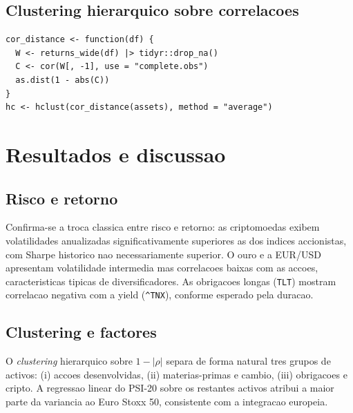 \documentclass[11pt,a4paper]{article}
\begin{document}
\subsection{Clustering hierarquico sobre correlacoes}
\begin{lstlisting}[caption={Distancia 1 - |cor| e dendrograma.}]
cor_distance <- function(df) {
  W <- returns_wide(df) |> tidyr::drop_na()
  C <- cor(W[, -1], use = "complete.obs")
  as.dist(1 - abs(C))
}
hc <- hclust(cor_distance(assets), method = "average")
\end{lstlisting}


\section{Resultados e discussao}

\subsection{Risco e retorno}

Confirma-se a troca classica entre risco e retorno: as criptomoedas
exibem volatilidades anualizadas significativamente superiores as dos
indices accionistas, com Sharpe historico nao necessariamente
superior. O ouro e a EUR/USD apresentam volatilidade intermedia mas
correlacoes baixas com as accoes, caracteristicas tipicas de
diversificadores. As obrigacoes longas (\verb|TLT|) mostram
correlacao negativa com a yield (\verb|^TNX|), conforme esperado pela
duracao.

\subsection{Clustering e factores}

O \emph{clustering} hierarquico sobre $1 - |\rho|$ separa de forma
natural tres grupos de activos: (i) accoes desenvolvidas, (ii)
materias-primas e cambio, (iii) obrigacoes e cripto. A regressao
linear do PSI-20 sobre os restantes activos atribui a maior parte da
variancia ao Euro Stoxx 50, consistente com a integracao europeia.
\end{document}
